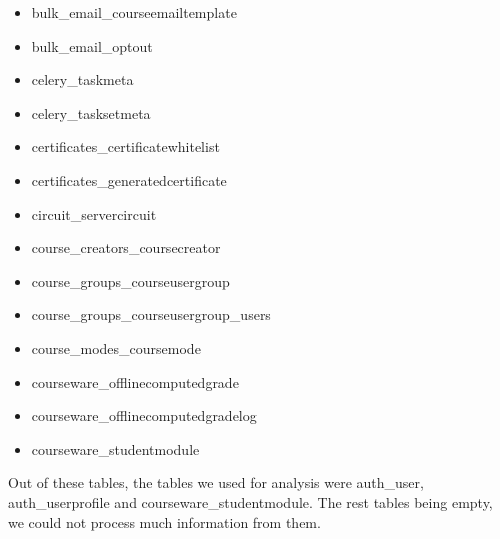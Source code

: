 \documentclass[a4paper,12pt,oneside]{sphinxmanual}
\begin{document}
\begin{itemize}
\item {} 
bulk\_email\_courseemailtemplate

\item {} 
bulk\_email\_optout

\item {} 
celery\_taskmeta

\item {} 
celery\_tasksetmeta

\item {} 
certificates\_certificatewhitelist

\item {} 
certificates\_generatedcertificate

\item {} 
circuit\_servercircuit

\item {} 
course\_creators\_coursecreator

\item {} 
course\_groups\_courseusergroup

\item {} 
course\_groups\_courseusergroup\_users

\item {} 
course\_modes\_coursemode

\item {} 
courseware\_offlinecomputedgrade

\item {} 
courseware\_offlinecomputedgradelog

\item {} 
courseware\_studentmodule

\end{itemize}

Out of these tables, the tables we used for analysis were auth\_user, auth\_userprofile and courseware\_studentmodule. The rest tables being empty, we could not process much information from them.
\end{document}
